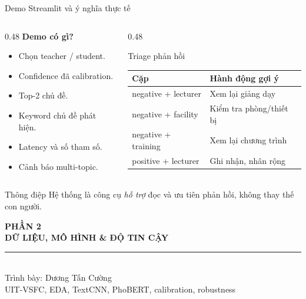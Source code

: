 \documentclass[aspectratio=169,11pt]{beamer}
\begin{document}
\begin{frame}{Demo Streamlit và ý nghĩa thực tế}
\begin{columns}[T]
\begin{column}{0.48\textwidth}
\textbf{ Demo có gì?}
\begin{itemize}
  \item Chọn teacher / student.
  \item Confidence đã calibration.
  \item Top-2 chủ đề.
  \item Keyword chủ đề phát hiện.
  \item Latency và số tham số.
  \item Cảnh báo multi-topic.
\end{itemize}
\end{column}
\begin{column}{0.48\textwidth}
\begin{block}{Triage phản hồi}
\begin{tabular}{@{}ll@{}}
\toprule
Cặp & Hành động gợi ý \\
\midrule
negative + lecturer & Xem lại giảng dạy \\
negative + facility & Kiểm tra phòng/thiết bị \\
negative + training & Xem lại chương trình \\
positive + lecturer & Ghi nhận, nhân rộng \\
\bottomrule
\end{tabular}
\end{block}
\end{column}
\end{columns}

\vspace{0.2cm}
\begin{block}{Thông điệp}
Hệ thống là công cụ \emph{hỗ trợ} đọc và ưu tiên phản hồi, không thay thế con người.
\end{block}
\end{frame}

\begin{frame}[plain]
\begin{center}
\vspace*{0.9cm}
{\small\bfseries\color{sgublue} PHẦN 2}\\[0.25cm]
{\Huge\bfseries\color{sgublue} DỮ LIỆU, MÔ HÌNH \& ĐỘ TIN CẬY}\\[0.2cm]
{\color{sgublue}\rule{0.55\textwidth}{0.8pt}}\\[0.2cm]
{\large Trình bày: Dương Tấn Cường}\\[0.2cm]
{\small UIT-VSFC, EDA, TextCNN, PhoBERT, calibration, robustness}\\[0.15cm]
\end{center}
\end{frame}
\end{document}
